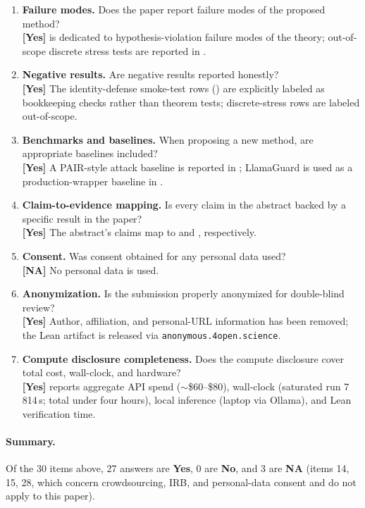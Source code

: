 \begin{enumerate}[leftmargin=1.9em,itemsep=0.25em]
\item \textbf{Failure modes.} Does the paper report failure modes of
the proposed method?
\\\textbf{[Yes]}  is dedicated to
hypothesis-violation failure modes of the theory; out-of-scope
discrete stress tests are reported in
.

\item \textbf{Negative results.} Are negative results reported
honestly?
\\\textbf{[Yes]} The identity-defense smoke-test rows
() are explicitly labeled as bookkeeping checks
rather than theorem tests; discrete-stress rows are labeled
out-of-scope.

\item \textbf{Benchmarks and baselines.} When proposing a new method,
are appropriate baselines included?
\\\textbf{[Yes]} A PAIR-style attack baseline is reported in
; LlamaGuard is used as a production-wrapper
baseline in .

\item \textbf{Claim-to-evidence mapping.} Is every claim in the
abstract backed by a specific result in the paper?
\\\textbf{[Yes]} The abstract's claims map to
and , respectively.

\item \textbf{Consent.} Was consent obtained for any personal data
used?
\\\textbf{[NA]} No personal data is used.

\item \textbf{Anonymization.} Is the submission properly anonymized
for double-blind review?
\\\textbf{[Yes]} Author, affiliation, and personal-URL information
has been removed; the Lean artifact is released via
\texttt{anonymous.4open.science}.

\item \textbf{Compute disclosure completeness.} Does the compute
disclosure cover total cost, wall-clock, and hardware?
\\\textbf{[Yes]}  reports aggregate API spend
($\sim$\$60--\$80), wall-clock (saturated run 7\,814\,s; total under
four hours), local inference (laptop via Ollama), and Lean
verification time.

\end{enumerate}

\paragraph{Summary.} Of the 30 items above, 27 answers are
\textbf{Yes}, 0 are \textbf{No}, and 3 are \textbf{NA} (items 14, 15,
28, which concern crowdsourcing, IRB, and personal-data consent and
do not apply to this paper).
